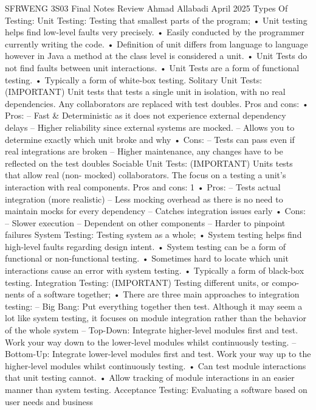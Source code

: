 \documentclass[10pt]{article}
\begin{document}
\begin{multicols}{2}
SFRWENG 3S03 Final Notes Review
Ahmad Allabadi
April 2025
Types Of Testing:
Unit Testing: Testing that smallest parts of the program;
• Unit testing helps find low-level faults very precisely.
• Easily conducted by the programmer currently writing the code.
• Definition of unit differs from language to language however in Java a
method at the class level is considered a unit.
• Unit Tests do not find faults between unit interactions.
• Unit Tests are a form of functional testing.
• Typically a form of white-box testing.
Solitary Unit Tests: (IMPORTANT) Unit tests that tests a single unit in
isolation, with no real dependencies. Any collaborators are replaced with test
doubles. Pros and cons:
• Pros:
– Fast & Deterministic as it does not experience external dependency
delays
– Higher reliability since external systems are mocked.
– Allows you to determine exactly which unit broke and why
• Cons:
– Tests can pass even if real integrations are broken
– Higher maintenance, any changes have to be reflected on the test
doubles
Sociable Unit Tests: (IMPORTANT) Units tests that allow real (non-
mocked) collaborators. The focus on a testing a unit’s interaction with real
components. Pros and cons:
1
• Pros:
– Tests actual integration (more realistic)
– Less mocking overhead as there is no need to maintain mocks for
every dependency
– Catches integration issues early
• Cons:
– Slower execution
– Dependent on other components
– Harder to pinpoint failures
System Testing: Testing system as a whole;
• System testing helps find high-level faults regarding design intent.
• System testing can be a form of functional or non-functional testing.
• Sometimes hard to locate which unit interactions cause an error with
system testing.
• Typically a form of black-box testing.
Integration Testing: (IMPORTANT) Testing different units, or compo-
nents of a software together;
• There are three main approaches to integration testing:
– Big Bang: Put everything together then test. Although it may seem
a lot like system testing, it focuses on module integration rather than
the behavior of the whole system
– Top-Down: Integrate higher-level modules first and test. Work your
way down to the lower-level modules whilst continuously testing.
– Bottom-Up: Integrate lower-level modules first and test.
Work
your way up to the higher-level modules whilst continuously testing.
• Can test module interactions that unit testing cannot.
• Allow tracking of module interactions in an easier manner than system
testing.
Acceptance Testing: Evaluating a software based on user needs and business

\end{multicols}
\end{document}
